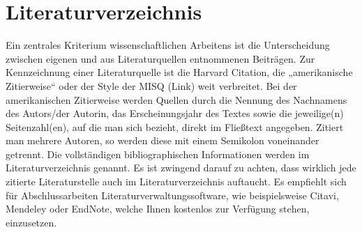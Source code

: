 \documentclass[12pt, oneside]{article}
\begin{document}
\newpage
\section*{Literaturverzeichnis} \label{Literaturverzeichnis}
%

Ein zentrales Kriterium wissenschaftlichen Arbeitens ist die Unterscheidung zwischen eigenen und aus Literaturquellen entnommenen Beiträgen. Zur Kennzeichnung einer Literaturquelle ist die Harvard Citation, die „amerikanische Zitierweise“ oder der Style der MISQ (Link) weit verbreitet. Bei der amerikanischen Zitierweise werden Quellen durch die Nennung des Nachnamens des Autors/der Autorin, das Erscheinungsjahr des Textes sowie die jeweilige(n) Seitenzahl(en), auf die man sich bezieht, direkt im Fließtext angegeben. Zitiert man mehrere Autoren, so werden diese mit einem Semikolon voneinander getrennt. Die vollständigen bibliographischen Informationen werden im Literaturverzeichnis genannt. Es ist zwingend darauf zu achten, dass wirklich jede zitierte Literaturstelle auch im Literaturverzeichnis auftaucht. Es empfiehlt sich für Abschlussarbeiten Literaturverwaltungssoftware, wie beispielsweise Citavi, Mendeley oder EndNote, welche Ihnen kostenlos zur Verfügung stehen, einzusetzen.
\end{document}
